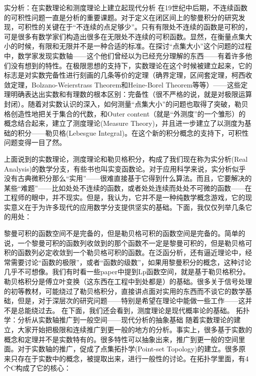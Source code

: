 实分析：在实数理论和测度理论上建立起现代分析
在19世纪中后期，不连续函数的可积性问题一直是分析的重要课题。对于定义在闭区间上的黎曼积分的研究发现，可积性的关键在于“不连续的点足够少”。只有有限处不连续的函数是可积的，可是很多有数学家们构造出很多在无限处不连续的可积函数。显然，在衡量点集大小的时候，有限和无限并不是一种合适的标准。在探讨“点集大小”这个问题的过程中，数学家发现实数轴——这个他们曾经以为已经充分理解的东西——有着许多他们没有想到的特性。在极限思想的支持下，实数理论在这个时候被建立起来，它的标志是对实数完备性进行刻画的几条等价的定理（确界定理，区间套定理，柯西收敛定理，Bolzano-Weierstrass Theorem和Heine-Borel Theorem等等）——这些定理明确表达出实数和有理数的根本区别：完备性（很不严格的说，就是对极限运算封闭）。随着对实数认识的深入，如何测量“点集大小”的问题也取得了突破，勒贝格创造性地把关于集合的代数，和Outer content（就是“外测度”的一个雏形）的概念结合起来，建立了测度理论(Measure Theory)，并且进一步建立了以测度为基础的积分——勒贝格(Lebesgue Integral)。在这个新的积分概念的支持下，可积性问题变得一目了然。

上面说到的实数理论，测度理论和勒贝格积分，构成了我们现在称为实分析(Real Analysis)的数学分支，有些书也叫实变函数论。对于应用科学来说，实分析似乎没有古典微积分那么“实用”——很难直接基于它得到什么算法。而且，它要解决的某些“难题”——比如处处不连续的函数，或者处处连续而处处不可微的函数——在工程师的眼中，并不现实。但是，我认为，它并不是一种纯数学概念游戏，它的现实意义在于为许多现代的应用数学分支提供坚实的基础。下面，我仅仅列举几条它的用处：

黎曼可积的函数空间不是完备的，但是勒贝格可积的函数空间是完备的。简单的说，一个黎曼可积的函数列收敛到的那个函数不一定是黎曼可积的，但是勒贝格可积的函数列必定收敛到一个勒贝格可积的函数。在泛函分析，还有逼近理论中，经常需要讨论“函数的极限”，或者“函数的级数”，如果用黎曼积分的概念，这种讨论几乎不可想像。我们有时看一些paper中提到Lp函数空间，就是基于勒贝格积分。
勒贝格积分是傅立叶变换（这东西在工程中到处都是）的基础。很多关于信号处理的初等教材，可能绕过了勒贝格积分，直接讲点面对实用的东西而不谈它的数学基础，但是，对于深层次的研究问题——特别是希望在理论中能做一些工作——这并不是总能绕过去。
在下面，我们还会看到，测度理论是现代概率论的基础。
拓扑学：分析从实数轴推广到一般空间——现代分析的抽象基础
随着实数理论的建立，大家开始把极限和连续推广到更一般的地方的分析。事实上，很多基于实数的概念和定理并不是实数特有的。很多特性可以抽象出来，推广到更一般的空间里面。对于实数轴的推广，促成了点集拓扑学(Point-set Topology)的建立。很多原来只存在于实数中的概念，被提取出来，进行一般性的讨论。在拓扑学里面，有4个C构成了它的核心：

